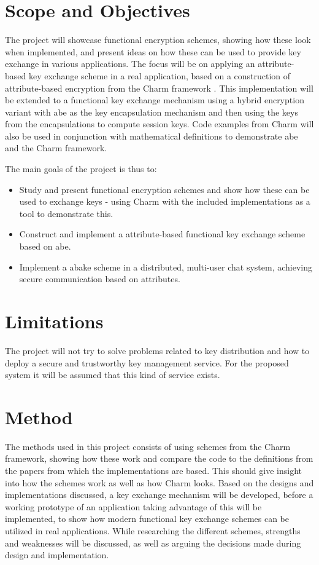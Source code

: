\section{Scope and Objectives}\label{sec:scope}

The project will showcase functional encryption schemes, showing how these look when implemented, and present ideas on how these can be used to provide key exchange in various applications. The focus will be on applying an attribute-based key exchange scheme in a real application, based on a construction of attribute-based encryption from the Charm framework \cite{DBLP:Charm13}. This implementation will be extended to a functional key exchange mechanism using a hybrid encryption variant with \gls{abe} as the key encapsulation mechanism and then using the keys from the encapsulations to compute session keys. Code examples from Charm will also be used in conjunction with mathematical definitions to demonstrate \gls{abe} and the Charm framework. 
\par The main goals of the project is thus to:
\begin{itemize}
\item Study and present functional encryption schemes and show how these can be used to exchange keys - using Charm with the included implementations as a tool to demonstrate this.
\item Construct and implement a attribute-based functional key exchange scheme based on \gls{abe}.
\item Implement a \gls{abake} scheme in a distributed, multi-user chat system, achieving secure communication based on attributes.
\end{itemize}

\section{Limitations}\label{sec:limitations}
The project will not try to solve problems related to key distribution and how to deploy a secure and trustworthy key management service. For the proposed system it will be assumed that this kind of service exists.

\section{Method}
The methods used in this project consists of using schemes from the Charm framework, showing how these work and compare the code to the definitions from the papers from which the implementations are based. This should give insight into how the schemes work as well as how Charm looks. Based on the designs and implementations discussed, a key exchange mechanism will be developed, before a working prototype of an application taking advantage of this will be implemented, to show how modern functional key exchange schemes can be utilized in real applications. While researching the different schemes, strengths and weaknesses will be discussed, as well as arguing the decisions made during design and implementation.


